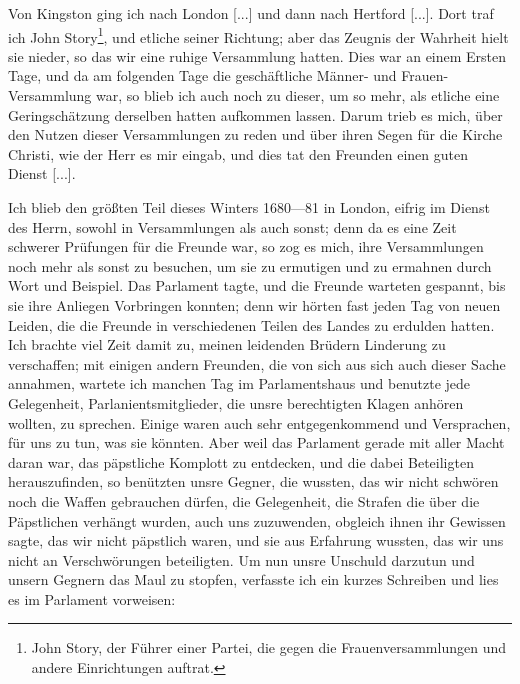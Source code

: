 Von Kingston ging ich nach London [...] und dann nach
Hertford [...]. Dort traf ich John 
Story\footnote{John Story, der Führer einer Partei, 
die gegen die Frauenversammlungen und andere Einrichtungen 
auftrat.}, und etliche seiner
Richtung; aber das Zeugnis der Wahrheit hielt sie nieder, so
das wir eine ruhige Versammlung hatten. Dies war an einem Ersten
Tage, und da am folgenden Tage die geschäftliche Männer- und
Frauen-Versammlung war, so blieb ich auch noch zu dieser, um
so mehr, als etliche eine Geringschätzung derselben hatten aufkommen
lassen. Darum trieb es mich, über den Nutzen dieser Versammlungen
zu reden und über ihren Segen für die Kirche Christi, wie der
Herr es mir eingab, und dies tat den Freunden einen guten
Dienst [...].

Ich blieb den größten Teil dieses Winters 1680—81 in London,
eifrig im Dienst des Herrn, sowohl in Versammlungen als auch
sonst; denn da es eine Zeit schwerer Prüfungen für die Freunde
war, so zog es mich, ihre Versammlungen noch mehr als sonst
zu besuchen, um sie zu ermutigen und zu ermahnen durch Wort
und Beispiel. Das Parlament tagte, und die Freunde warteten
gespannt, bis sie ihre Anliegen Vorbringen konnten; denn wir
hörten fast jeden Tag von neuen Leiden, die die Freunde in 
verschiedenen Teilen des Landes zu erdulden hatten. Ich brachte
viel Zeit damit zu, meinen leidenden Brüdern Linderung zu 
verschaffen; mit einigen andern Freunden, die von sich aus sich auch
dieser Sache annahmen, wartete ich manchen Tag im 
Parlamentshaus und benutzte jede Gelegenheit, Parlanientsmitglieder, die
unsre berechtigten Klagen anhören wollten, 
zu sprechen. Einige
waren auch sehr entgegenkommend und Versprachen, für uns zu
tun, was sie könnten. Aber weil das Parlament gerade mit
aller Macht daran war, das päpstliche Komplott zu entdecken,
und die dabei Beteiligten herauszufinden, so benützten unsre Gegner,
die wussten, das wir nicht schwören noch die Waffen gebrauchen
dürfen, die Gelegenheit, die Strafen die über die Päpstlichen 
verhängt wurden, auch uns zuzuwenden, obgleich ihnen ihr Gewissen
sagte, das wir nicht päpstlich waren, und sie aus Erfahrung
wussten, das wir uns nicht an Verschwörungen beteiligten. Um
nun unsre Unschuld darzutun und unsern Gegnern das Maul zu
stopfen, verfasste ich ein kurzes Schreiben und lies es im 
Parlament vorweisen:

